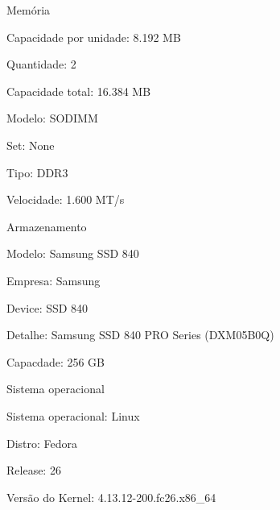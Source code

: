 \begin{alineas}
  \item Memória

  \begin{alineas}

     \item Capacidade por unidade: 8.192 MB

     \item Quantidade: 2

     \item Capacidade total: 16.384 MB

     \item Modelo: SODIMM

     \item Set: None

     \item Tipo: DDR3

     \item Velocidade: 1.600 MT/s

  \end{alineas}

  \item Armazenamento

  \begin{alineas}

     \item Modelo: Samsung SSD 840

     \item Empresa: Samsung

     \item Device: SSD 840

     \item Detalhe: Samsung SSD 840 PRO Series (DXM05B0Q)

     \item Capacdade: 256 GB

  \end{alineas}

  \item Sistema operacional

  \begin{alineas}

     \item Sistema operacional: Linux

     \item Distro: Fedora

     \item Release: 26

     \item Versão do Kernel: 4.13.12-200.fc26.x86\_64

  \end{alineas}

\end{alineas}
